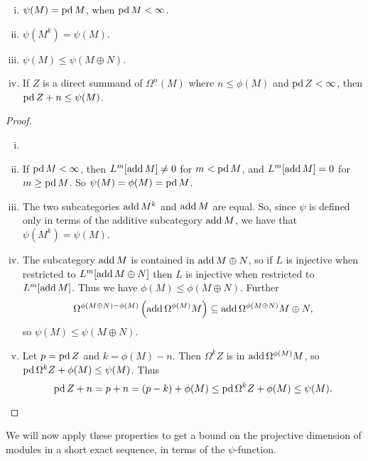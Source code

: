 \begin{lemma} \cite[Lemma~3]{IgTo05} \label{lem:properties_of_psi}
	\begin{enumerate}[i)]
		\item $\psi(M) = \operatorname{pd} M$, when $\operatorname{pd} M < \infty$.
		\item $\psi(M^k) = \psi(M)$.
		\item $\psi(M) \leq \psi(M\oplus N)$.
		\item If $Z$ is a direct summand of $\Omega^n(M)$ where $n \leq \phi(M)$ and $\operatorname{pd} Z < \infty$, then $\operatorname{pd} Z + n \leq \psi(M)$.
	\end{enumerate}
	\begin{proof}
		\begin{enumerate}[i)]
			\item[] %
			\item If $\operatorname{pd} M < \infty$, then $L^m[\operatorname{add} M] \neq 0$ for $m < \operatorname{pd} M$, and $L^m[\operatorname{add} M] =0$ for $m \geq \operatorname{pd} M$. So $\psi(M)=\phi(M)=\operatorname{pd} M$.
			\item The two subcategories $\operatorname{add} M^k$ and $\operatorname{add} M$ are equal. So, since $\psi$ is defined only in terms of the additive subcategory $\operatorname{add} M$, we have that $\psi(M^k)=\psi(M)$.
			\item  The subcategory $\operatorname{add} M$ is contained in $\operatorname{add} M\oplus N$, so if $L$ is injective when restricted to $L^m[\operatorname{add} M\oplus N]$ then $L$ is injective when restricted to $L^m[\operatorname{add} M]$. Thus we have $\phi(M) \leq \phi({M\oplus N})$. Further $$\Omega^{\phi({M\oplus N})-\phi(M)}\left(\operatorname{add}\Omega^{\phi(M)}M \right) \subseteq \operatorname{add}\Omega^{\phi({M\oplus N})} M\oplus N,$$ 
			so $\psi(M) \leq \psi(M\oplus N)$.
			\item Let $p=\operatorname{pd} Z$ and $k = \phi(M) - n$. Then $\Omega^k Z$ is in $\operatorname{add} \Omega^{\phi(M)}M$, so $\operatorname{pd}\Omega^k Z + \phi(M) \leq \psi(M)$. Thus $$\operatorname{pd} Z + n = p + n = (p-k) + \phi(M) \leq \operatorname{pd}\Omega^k Z + \phi(M) \leq \psi(M).$$
		\end{enumerate}
	\end{proof}
\end{lemma}

We will now apply these properties to get a bound on the projective dimension of modules in a short exact sequence, in terms of the $\psi$-function.

